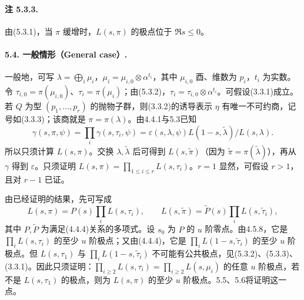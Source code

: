 \paragraph*{注 5.3.3.}
由(5.3.1)，当 $\pi$ 缓增时，$L(s,\pi)$ 的极点位于 $\Re s\leq0$。

\paragraph*{5.4. 一般情形（General case）.}
一般地，可写 $\lambda=\bigoplus_i\mu_i$，$\mu_i=\mu_{i,0}\otimes\alpha^{t_i}$，其中 $\mu_{i,0}$ 酉、维数为 $p_i$，$t_i$ 为实数。令 $\tau_{i,0}=\pi(\mu_{i,0})$、$\tau_i=\pi(\mu_i)$；由(5.3.2)，$\tau_i=\tau_{i,0}\otimes\alpha^{t_i}$。可假设(3.3.1)成立。若 $Q$ 为型 $(p_1,\ldots,p_r)$ 的抛物子群，则(3.3.2)的诱导表示 $\eta$ 有唯一不可约商，记号如(3.3.3)；该商就是 $\pi=\pi(\lambda)$。由4.4.1与5.3已知
\[
 \gamma(s,\pi,\psi)=\prod_i\gamma(s,\tau_i,\psi)
 =\varepsilon(s,\lambda,\psi)L(1-s,\widetilde\lambda)/L(s,\lambda).
\]
所以只须计算 $L(s,\pi)$。交换 $\lambda,\widetilde\lambda$ 后可得到 $L(s,\widetilde\pi)$（因为 $\widetilde\pi=\pi(\widetilde\lambda)$），再从 $\gamma$ 得到 $\varepsilon$。只须证明 $L(s,\pi)=\prod_{1\leq i\leq r}L(s,\tau_i)$。$r=1$ 显然，可假设 $r>1$，且对 $r-1$ 已证。

由已经证明的结果，先可写成
\[
 L(s,\pi)=P(s)\prod_iL(s,\tau_i),\qquad
 L(s,\widetilde\pi)=\widetilde P(s)\prod_iL(s,\widetilde\tau_i),
\]
其中 $P,\widetilde P$ 为满足(4.4.4)关系的多项式。设 $s_0$ 为 $P$ 的 $u$ 阶零点。由4.5.8，它是 $\prod_iL(s,\tau_i)$ 的至少 $u$ 阶极点；又由(4.4.4)，它是 $\prod_iL(1-s,\widetilde\tau_i)$ 的至少 $u$ 阶极点。但 $L(s,\tau_1)$ 与 $\prod_iL(1-s,\widetilde\tau_i)$ 不可能有公共极点，见(5.3.2)、(5.3.3)、(3.3.1)。因此只须证明：$\prod_{i\geq2}L(s,\tau_i)=\prod_{i\geq2}L(s,\mu_i)$ 的任意 $u$ 阶极点，若不是 $L(s,\tau_1)$ 的极点，则为 $L(s,\pi)$ 的至少 $u$ 阶极点。5.5、5.6将证明这一点。

